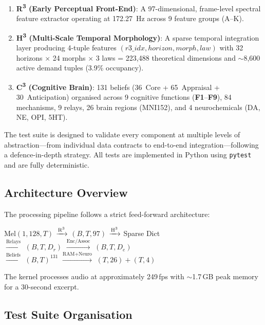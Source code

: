 \documentclass[10pt,twocolumn]{article}
\newcommand{\Rthree}{R\textsuperscript{3}}
\newcommand{\Hthree}{H\textsuperscript{3}}
\newcommand{\Cthree}{C\textsuperscript{3}}
\newcommand{\fn}[1]{\textbf{F#1}}
\begin{document}
\begin{enumerate}[nosep,leftmargin=*]
  \item \textbf{\Rthree{} (Early Perceptual Front-End)}: A 97-dimensional, frame-level spectral feature extractor operating at \SI{172.27}{\hertz} across 9 feature groups (A--K).
  \item \textbf{\Hthree{} (Multi-Scale Temporal Morphology)}: A sparse temporal integration layer producing 4-tuple features $(r3\_idx, horizon, morph, law)$ with 32 horizons $\times$ 24 morphs $\times$ 3 laws = 223,488 theoretical dimensions and $\sim$8,600 active demand tuples (3.9\% occupancy).
  \item \textbf{\Cthree{} (Cognitive Brain)}: 131 beliefs (36~Core + 65~Appraisal + 30~Anticipation) organised across 9 cognitive functions (\fn{1}--\fn{9}), 84 mechanisms, 9 relays, 26 brain regions (MNI152), and 4 neurochemicals (DA, NE, OPI, 5HT).
\end{enumerate}

The test suite is designed to validate every component at multiple levels of abstraction---from individual data contracts to end-to-end integration---following a defence-in-depth strategy. All tests are implemented in Python using \texttt{pytest} and are fully deterministic.

\subsection{Architecture Overview}

The processing pipeline follows a strict feed-forward architecture:

\begin{center}
\small
Mel$(1,128,T)$ $\xrightarrow{\text{\Rthree{}}}$ $(B,T,97)$ $\xrightarrow{\text{\Hthree{}}}$ Sparse Dict\\[2pt]
$\xrightarrow{\text{Relays}}$ $(B,T,D_r)$ $\xrightarrow{\text{Enc/Assoc}}$ $(B,T,D_e)$\\[2pt]
$\xrightarrow{\text{Beliefs}}$ $(B,T)^{131}$ $\xrightarrow{\text{RAM+Neuro}}$ $(T,26)+(T,4)$
\end{center}

The kernel processes audio at approximately 249\,fps with $\sim$1.7\,GB peak memory for a 30-second excerpt.

\subsection{Test Suite Organisation}
\end{document}
